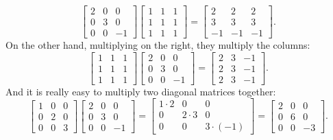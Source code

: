\begin{equation*}
\begin{bmatrix}
2 & 0 & 0 \\
0 & 3 & 0 \\
0 & 0 & -1
\end{bmatrix}
\begin{bmatrix}
1 & 1 & 1 \\
1 & 1 & 1 \\
1 & 1 & 1 
\end{bmatrix}
=
\begin{bmatrix}
2 & 2 & 2 \\
3 & 3 & 3 \\
-1 & -1 & -1 
\end{bmatrix} .
\end{equation*}
On the other hand, multiplying on the right, they multiply the columns:
\begin{equation*}
\begin{bmatrix}
1 & 1 & 1 \\
1 & 1 & 1 \\
1 & 1 & 1 
\end{bmatrix}
\begin{bmatrix}
2 & 0 & 0 \\
0 & 3 & 0 \\
0 & 0 & -1
\end{bmatrix}
=
\begin{bmatrix}
2 & 3 & -1 \\
2 & 3 & -1 \\
2 & 3 & -1 
\end{bmatrix} .
\end{equation*}
And it is really easy to multiply two diagonal matrices together:
\begin{equation*}
\begin{bmatrix}
1 & 0 & 0 \\
0 & 2 & 0 \\
0 & 0 & 3 
\end{bmatrix}
\begin{bmatrix}
2 & 0 & 0 \\
0 & 3 & 0 \\
0 & 0 & -1
\end{bmatrix}
=
\begin{bmatrix}
1 \cdot 2 & 0 & 0 \\
0 & 2 \cdot 3 & 0 \\
0 & 0 & 3 \cdot (-1) 
\end{bmatrix}
=
\begin{bmatrix}
2 & 0 & 0 \\
0 & 6 & 0 \\
0 & 0 & -3 
\end{bmatrix} .
\end{equation*}

